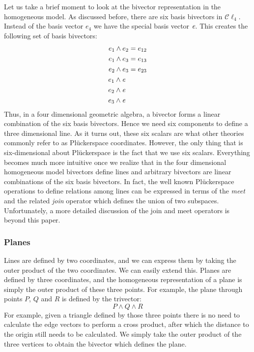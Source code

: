 \documentclass[10pt]{report}
\begin{document}
Let us take a brief moment to look at the bivector representation
in the homogeneous model. As discussed before, there are six basis
bivectors in $\mathcal{C}\ell_4$. Instead of the basis vector
$e_4$ we have the special basis vector $\emph{e}$. This creates
the following set of basis bivectors:
\begin{align*}
            e_1\wedge e_2 &= e_{12} \\
            e_1\wedge e_3 &= e_{13} \\
            e_2\wedge e_3 &= e_{23} \\
            e_1\wedge \emph{e}\;\: &    \\
            e_2\wedge \emph{e}\;\: &   \\
            e_3\wedge \emph{e}\;\: &
\end{align*}
Thus, in a four dimensional geometric algebra, a bivector forms a
linear combination of the six basis bivectors. Hence we need six
components to define a three dimensional line. As it turns out,
these six scalars are what other theories commonly refer to as
Pl\"uckerspace coordinates. However, the only thing that is
six-dimensional about Pl\"uckerspace is the fact that we use six
scalars. Everything becomes much more intuitive once we realize
that in the four dimensional homogeneous model bivectors define
lines and arbitrary bivectors are linear combinations of the six
basis bivectors. In fact, the well known Pl\"uckerspace operations
to define relations among lines can be expressed in terms of the
\emph{meet} and the related \emph{join} operator which defines the
union of two subspaces. Unfortunately, a more detailed discussion
of the join and meet operators is beyond this paper.

\subsubsection{Planes}

Lines are defined by two coordinates, and we can express them by
taking the outer product of the two coordinates. We can easily
extend this. Planes are defined by three coordinates, and the
homogeneous representation of a plane is simply the outer product
of these three points. For example, the plane through points $P$,
$Q$ and $R$ is defined by the trivector:
\begin{displaymath}
    P\wedge Q\wedge R
\end{displaymath}
For example, given a triangle defined by those three points there
is no need to calculate the edge vectors to perform a cross
product, after which the distance to the origin still needs to be
calculated. We simply take the outer product of the three vertices
to obtain the bivector which defines the plane.
\end{document}
